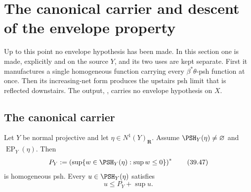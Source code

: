\section{The canonical carrier and descent of the envelope property}
\label{sec:ch39-descent}

Up to this point no envelope hypothesis has been made.  In this section one
is made, explicitly and on the source $Y$, and its two uses are kept
separate.  First it manufactures a single homogeneous function carrying
every $\beta^*\theta$-psh function at once.  Then its increasing-net form
produces the upstairs psh limit that is reflected downstairs.  The output,
, carries no envelope hypothesis on
$X$.

\subsection{The canonical carrier}
\label{sec:ch39-canonical-carrier}

\begin{lemma}
\label{lem:bj-canonical-carrier}
Let $Y$ be normal projective and let
$\eta\in N^1(Y)_{\mathbf R}$.  Assume
$\PSH_Y(\eta)\ne\varnothing$ and
$\operatorname{EP}_Y(\eta)$.  Then
\[
 P_Y:=\left(\sup\{w\in\PSH_Y(\eta):\sup w\le0\}\right)^*
\tag{39.47}\label{eq:bj-canonical-carrier}
\]
is homogeneous psh.  Every $u\in\PSH_Y(\eta)$ satisfies
\[
                              u\le P_Y+\sup u.
\tag{39.48}\label{eq:bj-canonical-carrier-bound}
\]
\end{lemma}

